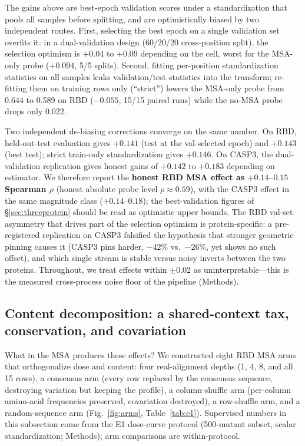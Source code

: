 \documentclass[11pt]{article}
\begin{document}
The gains above are best-epoch validation scores under a standardization that
pools all samples before splitting, and are optimistically biased by two
independent routes. First, selecting the best epoch on a single validation set
overfits it: in a dual-validation design (60/20/20 cross-position split), the
selection optimism is $+0.04$ to $+0.09$ depending on the cell, worst for the
MSA-only probe ($+0.094$, 5/5 splits). Second, fitting per-position
standardization statistics on all samples leaks validation/test statistics
into the transform; re-fitting them on training rows only (``strict'') lowers
the MSA-only probe from 0.644 to 0.589 on RBD ($-0.055$, 15/15 paired runs)
while the no-MSA probe drops only 0.022.

Two independent de-biasing corrections converge on the same number. On RBD,
held-out-test evaluation gives $+0.141$ (test at the val-selected epoch) and
$+0.143$ (best test); strict train-only standardization gives $+0.146$. On
CASP3, the dual-validation replication gives honest gains of $+0.142$ to
$+0.183$ depending on estimator. We therefore report the \textbf{honest RBD
MSA effect as $+0.14$--$0.15$ Spearman $\rho$} (honest absolute probe level
$\rho \approx 0.59$), with the CASP3 effect in the same magnitude class
($+0.14$--$0.18$); the best-validation figures of \S\ref{sec:threeprotein}
should be read as optimistic upper bounds. The RBD val-set asymmetry that
drives part of the selection optimism is protein-specific: a pre-registered
replication on CASP3 falsified the hypothesis that stronger geometric pinning
causes it (CASP3 pins harder, $-42\%$ vs.\ $-26\%$, yet shows no such offset),
and which single stream is stable versus noisy inverts between the two
proteins. Throughout, we treat effects within $\pm 0.02$ as
uninterpretable---this is the measured cross-process noise floor of the
pipeline (Methods).

\subsection{Content decomposition: a shared-context tax, conservation, and covariation}
\label{sec:e1}

What in the MSA produces these effects? We constructed eight RBD MSA arms that
orthogonalize dose and content: four real-alignment depths (1, 4, 8, and all
15 rows), a consensus arm (every row replaced by the consensus sequence,
destroying variation but keeping the profile), a column-shuffle arm
(per-column amino-acid frequencies preserved, covariation destroyed), a
row-shuffle arm, and a random-sequence arm (Fig.~\ref{fig:arms},
Table~\ref{tab:e1}). Supervised numbers in this subsection come from the
E1 dose-curve protocol (500-mutant subset, scalar standardization; Methods);
arm comparisons are within-protocol.
\end{document}
